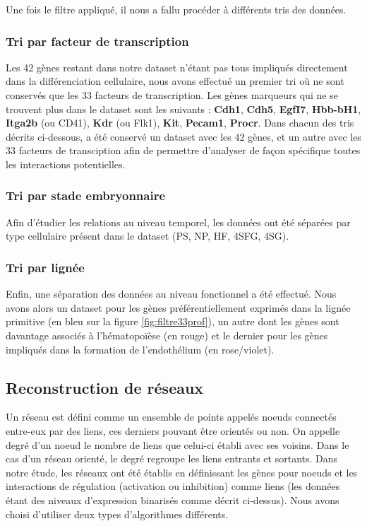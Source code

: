 \documentclass[fleqn,11pt]{SelfArx} %
\begin{document}
Une fois le filtre appliqué, il nous a fallu procéder à différents tris des données. 
\subsubsection{Tri par facteur de transcription}
Les 42 gènes restant dans notre dataset n'étant pas tous impliqués directement dans la différenciation cellulaire, nous avons effectué un premier tri où ne sont conservés que les 33 facteurs de transcription. Les gènes marqueurs qui ne se trouvent plus dans le dataset sont les suivants : \textbf{Cdh1}, \textbf{Cdh5}, \textbf{EgfI7}, \textbf{Hbb-bH1}, \textbf{Itga2b} (ou CD41), \textbf{Kdr} (ou Flk1), \textbf{Kit}, \textbf{Pecam1}, \textbf{Procr}. Dans chacun des tris décrits ci-dessous, a été conservé un dataset avec les 42 gènes, et un autre avec les 33 facteurs de transciption afin de permettre d'analyser de façon spécifique toutes les interactions potentielles.
\subsubsection{Tri par stade embryonnaire}
Afin d'étudier les relations au niveau temporel, les données ont été séparées par type cellulaire présent dans le dataset (PS, NP, HF, 4SFG, 4SG). 
\subsubsection{Tri par lignée}
Enfin, une séparation des données au niveau fonctionnel a été effectué. Nous avons alors un dataset pour les gènes préférentiellement exprimés dans la lignée primitive (en bleu sur la figure \ref{fig:filtre33prof}), un autre dont les gènes sont davantage associés à l'hématopoïèse (en rouge) et le dernier pour les gènes impliqués dans la formation de l'endothélium (en rose/violet).


\subsection{Reconstruction de réseaux}
Un réseau est défini comme un ensemble de points appelés noeuds connectés entre-eux par des liens, ces derniers pouvant être orientés ou non. On appelle degré d'un noeud le nombre de liens que celui-ci établi avec ses voisins. Dans le cas d'un réseau orienté, le degré regroupe les liens entrants et sortants. Dans notre étude, les réseaux ont été établis en définissant les gènes pour noeuds et les interactions de régulation (activation ou inhibition) comme liens (les données étant des niveaux d'expression binarisés comme décrit ci-dessus). Nous avons choisi d'utiliser deux types d'algorithmes différents.
\end{document}
